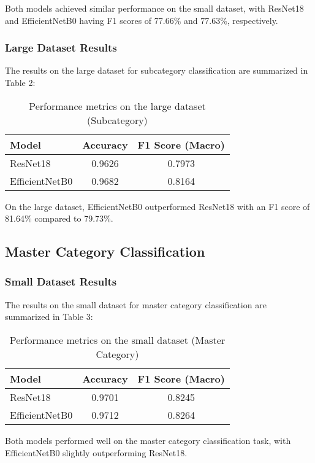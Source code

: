 \documentclass[10pt,journal,compsoc]{IEEEtran}
\begin{document}
Both models achieved similar performance on the small dataset, with ResNet18 and EfficientNetB0 having F1 scores of 77.66\% and 77.63\%, respectively.

\subsubsection{Large Dataset Results}
The results on the large dataset for subcategory classification are summarized in Table 2:

\begin{table}[htbp]
\centering
\caption{Performance metrics on the large dataset (Subcategory)}
\begin{tabular}{|l|c|c|}
\hline
\textbf{Model} & \textbf{Accuracy} & \textbf{F1 Score (Macro)} \\
\hline
ResNet18 & 0.9626 & 0.7973 \\
\hline
EfficientNetB0 & 0.9682 & 0.8164 \\
\hline
\end{tabular}
\end{table}

On the large dataset, EfficientNetB0 outperformed ResNet18 with an F1 score of 81.64\% compared to 79.73\%.

\subsection{Master Category Classification}

\subsubsection{Small Dataset Results}
The results on the small dataset for master category classification are summarized in Table 3:

\begin{table}[htbp]
\centering
\caption{Performance metrics on the small dataset (Master Category)}
\begin{tabular}{|l|c|c|}
\hline
\textbf{Model} & \textbf{Accuracy} & \textbf{F1 Score (Macro)} \\
\hline
ResNet18 & 0.9701 & 0.8245 \\
\hline
EfficientNetB0 & 0.9712 & 0.8264 \\
\hline
\end{tabular}
\end{table}

Both models performed well on the master category classification task, with EfficientNetB0 slightly outperforming ResNet18.
\end{document}
